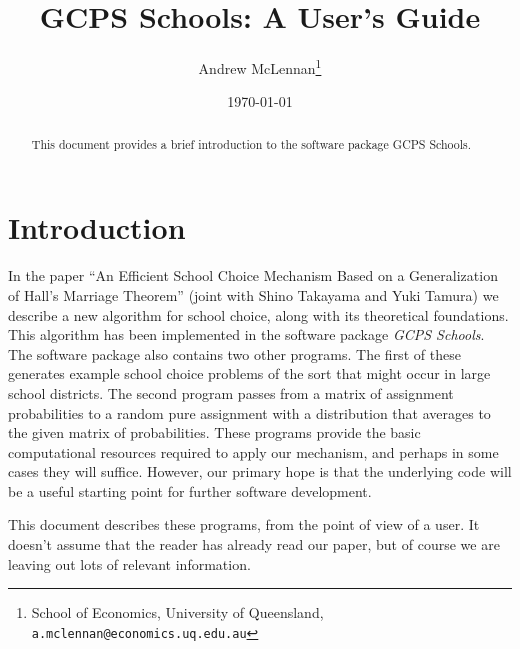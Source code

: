 \documentclass[12pt]{article}
\theoremstyle{definition}
\begin{document}
\title{GCPS Schools: A User's Guide}

\author{Andrew McLennan\footnote{School of Economics, University of
    Queensland, {\tt a.mclennan@economics.uq.edu.au}}}

\date{\today}

\maketitle

\begin{abstract}
This document provides a brief introduction to the software package GCPS Schools.
\end{abstract}


\section{Introduction}

In the paper ``An Efficient School Choice Mechanism Based on a
Generalization of Hall's Marriage Theorem'' (joint with Shino Takayama
and Yuki Tamura) we describe a new algorithm for school choice, along
with its theoretical foundations.  This algorithm has been implemented
in the software package \emph{GCPS Schools}.  The software package
also contains two other programs.  The first of these generates
example school choice problems of the sort that might occur in large
school districts.  The second program passes from a matrix of
assignment probabilities to a random pure assignment with a
distribution that averages to the given matrix of probabilities.
These programs provide the basic computational resources required to
apply our mechanism, and perhaps in some cases they will suffice.
However, our primary hope is that the underlying code will be a useful
starting point for further software development.

This document describes these programs, from the point of view of a
user.  It doesn't assume that the reader has already read our paper,
but of course we are leaving out lots of relevant information.
\end{document}

